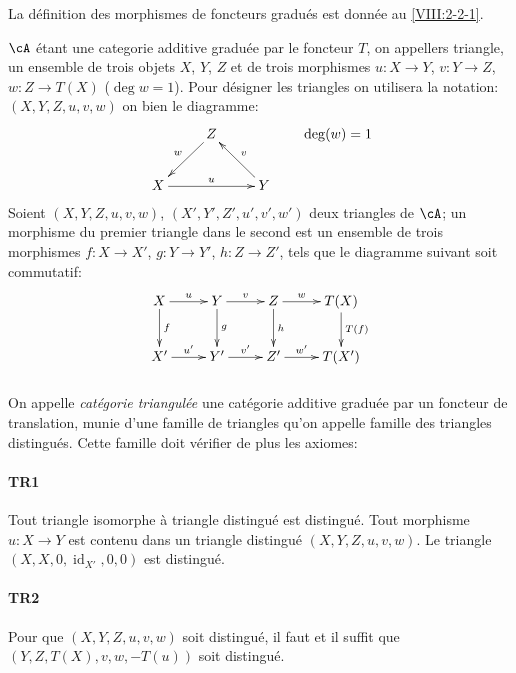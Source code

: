 La d\'efinition des morphismes de foncteurs gradu\'es est donn\'ee au 
\ref{VIII:2-2-1}. 

$\cA$ \'etant une categorie additive gradu\'ee par le foncteur $T$, on 
appellers triangle, un ensemble de trois objets $X$, $Y$, $Z$ et de trois 
morphismes $u:X\to Y$, $v:Y\to Z$, $w:Z\to T(X)$ ($\deg w=1$). Pour d\'esigner 
les triangles on utilisera la notation: $(X,Y,Z,u,v,w)$ on bien le diagramme: 
\[\xymatrix{
  & Z \ar[dl]_-w \\
  X \ar[rr]^-u 
    & & Y \ar[lu]_-v 
}\qquad \deg(w)=1
\]
Soient $(X,Y,Z,u,v,w)$, $(X',Y',Z',u',v',w')$ deux triangles de $\cA$; un 
morphisme du premier triangle dans le second est un ensemble de trois 
morphismes $f:X\to X'$, $g:Y\to Y'$, $h:Z\to Z'$, tels que le diagramme 
suivant soit commutatif: 
\[\xymatrix{
  X \ar[r]^-u \ar[d]^-f 
    & Y \ar[r]^-v \ar[d]^-g 
    & Z \ar[r]^-w \ar[d]^-h 
    & T(X) \ar[d]^-{T(f)} \\
  X' \ar[r]^-{u'} 
    & Y' \ar[r]^-{v'} 
    & Z' \ar[r]^-{w'} 
    & T(X') 
}\]





\subsubsection{}\label{VIII:1-1-1}

On appelle \emph{cat\'egorie triangul\'ee} une cat\'egorie additive gradu\'ee 
par un foncteur de translation, munie d'une famille de triangles qu'on appelle 
famille des triangles distingu\'es. Cette famille doit v\'erifier de plus les 
axiomes: 


\paragraph{TR1}
\hypertarget{VIII:TR1}{}

Tout triangle isomorphe \`a triangle distingu\'e est distingu\'e. Tout 
morphisme $u:X\to Y$ est contenu dans un triangle distingu\'e 
$(X,Y,Z,u,v,w)$. Le triangle $(X,X,0,\operatorname{id}_{X'},0,0)$ est 
distingu\'e. 


\paragraph{TR2}
\hypertarget{VIII:TR2}{}

Pour que $(X,Y,Z,u,v,w)$ soit distingu\'e, il faut et il suffit que 
$(Y,Z,T(X),v,w,-T(u))$ soit distingu\'e. 


